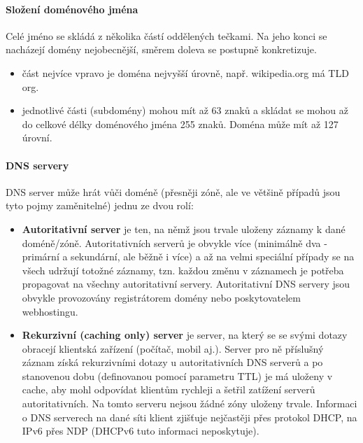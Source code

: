 \documentclass[10pt,a4paper]{article}
\begin{document}
\paragraph{Složení doménového jména} Celé jméno se skládá z několika částí oddělených tečkami. Na jeho konci se nacházejí domény nejobecnější, směrem doleva se postupně konkretizuje.
\begin{itemize}
	\item část nejvíce vpravo je doména nejvyšší úrovně, např. wikipedia.org má TLD org.
	\item jednotlivé části (subdomény) mohou mít až 63 znaků a skládat se mohou až do celkové délky doménového jména 255 znaků. Doména může mít až 127 úrovní.
\end{itemize}
\paragraph{DNS servery} DNS server může hrát vůči doméně (přesněji zóně, ale ve většině případů jsou tyto pojmy zaměnitelné) jednu ze dvou rolí:
\begin{itemize}
	\item \textbf{Autoritativní server} je ten, na němž jsou trvale uloženy záznamy k dané doméně/zóně. Autoritativních serverů je obvykle více (minimálně dva - primární a sekundární, ale běžně i více) a až na velmi speciální případy se na všech udržují totožné záznamy, tzn. každou změnu v záznamech je potřeba propagovat na všechny autoritativní servery. Autoritativní DNS servery jsou obvykle provozovány registrátorem domény nebo poskytovatelem webhostingu.
	\item \textbf{Rekurzivní (caching only) server} je server, na který se se svými dotazy obracejí klientská zařízení (počítač, mobil aj.). Server pro ně příslušný záznam získá rekurzivními dotazy u autoritativních DNS serverů a po stanovenou dobu (definovanou pomocí parametru TTL) je má uloženy v cache, aby mohl odpovídat klientům rychleji a šetřil zatížení serverů autoritativních. Na tomto serveru nejsou žádné zóny uloženy trvale. Informaci o DNS serverech na dané síti klient zjišťuje nejčastěji přes protokol DHCP, na IPv6 přes NDP (DHCPv6 tuto informaci neposkytuje).
\end{itemize}
\end{document}
